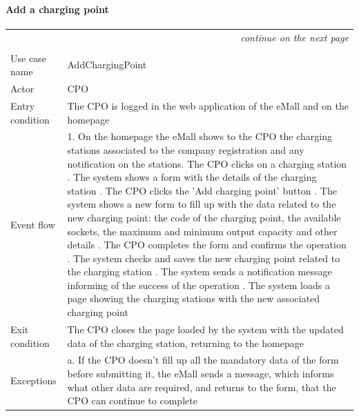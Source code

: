 \paragraph{Add a charging point}
\begin{center}
    \begin{longtable}{p{4cm} p{11cm}}
    \multicolumn{2}{r}{\itshape{continue on the next page}}\\
    \endfoot 
    \\
    \endlastfoot
    \hline
     Use case name &  AddChargingPoint\\
     \hline
     Actor & CPO \\
     \hline
     Entry condition & The CPO is logged in the web application of the eMall and on the homepage \\
     \hline
     Event flow & 1. On the homepage the eMall shows to the CPO the charging stations                   associated to the company registration and any notification on the                 stations\newline
                    2. The CPO clicks on a charging station \newline 
                    3. The system shows a form with the details of the charging station \newline
                    4. The CPO clicks the 'Add charging point' button \newline
                    5. The system shows a new form to fill up with the data related to the new charging point: the code of the charging point, the available sockets, the maximum and minimum output capacity and other details \newline
                    6. The CPO completes the form and confirms the operation \newline
                    7. The system checks and saves the new charging point related to the charging station \newline
                    8. The system sends a notification message informing of the success of the operation \newline
                    9. The system loads a page showing the charging stations with the new associated charging point\\
     \hline
     Exit condition &  The CPO closes the page loaded by the system with the updated data of the charging station, returning to the homepage \\
     \hline
     Exceptions &   a. If the CPO doesn't fill up all the mandatory data of the form                    before submitting it, the eMall sends a message, which informs                     what other data are required, and returns to the form, that the                    CPO can continue to complete \newline

\end{longtable}
\end{center}
